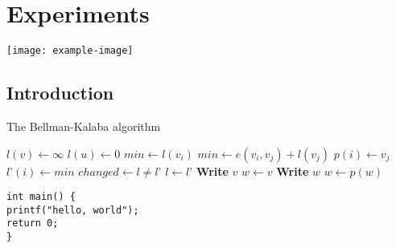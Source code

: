 \chapter{Experiments}
\label{ch6:Experiments}

\begin{mdframed}
\zhlipsum[1][name=xiangyu]
\begin{center}
    \texttt{[image: example-image]}
\end{center}
\zhlipsum[2][name=xiangyu]
\end{mdframed}

\begin{mdframed}
\zhlipsum[3][name=xiangyu]
\end{mdframed}

\begin{multicols}{2}
\zhlipsum[4][name=xiangyu]
\end{multicols}

\begin{multicols}{3}
\zhlipsum[5][name=xiangyu]
\end{multicols}

\section{Introduction}
\label{ch6:sec:Introduction}

\begin{algorithm}[!t]
\caption{The Bellman-Kalaba algorithm}
\begin{algorithmic}[1]
\State $l(v) \leftarrow \infty$
\EndFor
\State $l(u) \leftarrow 0$
\Repeat
{}
\State $min \leftarrow l(v_i)$
\State $min \leftarrow e(v_i, v_j) + l(v_j)$
\State $p(i) \leftarrow v_j$
\EndIf
\EndFor
\State $l’(i) \leftarrow min$
\EndFor
\State $changed \leftarrow l \not= l’$
\State $l \leftarrow l’$
\EndProcedure
\Statex
{}
\State \textbf{Write} $v$
\Else
\State $w \leftarrow v$
\State \textbf{Write} $w$
\State $w \leftarrow p(w)$
\EndWhile
\EndIf
\EndProcedure
\end{algorithmic}
\end{algorithm}

\begin{code}
\label{code:c-code}
\begin{verbatim}
int main() {
printf("hello, world");
return 0;
}
\end{verbatim}
\end{code}

